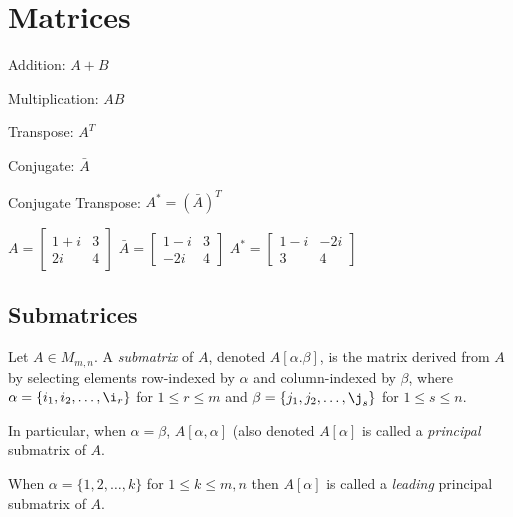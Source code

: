 \documentclass[letterpaper,12pt,fleqn]{article}
\renewcommand{\a}{\alpha}
\renewcommand{\b}{\beta}
\begin{document}
\section*{Matrices}

\begin{definition}[Operations]
  \listbreak
  \begin{description}
  \item Addition: $A+B$
  \item Multiplication: $AB$
  \item Transpose: $A^T$
  \item Conjugate: $\bar{A}$
  \item Conjugate Transpose: $A^*=(\bar{A})^T$
  \end{description}
\end{definition}

\begin{example}
  $A=\begin{bmatrix} 1+i & 3 \\ 2i & 4 \end{bmatrix}$
  \hspace{4ex}
  $\bar{A}=\begin{bmatrix} 1-i & 3 \\ -2i & 4 \end{bmatrix}$
  \hspace{4ex}
  $A^*=\begin{bmatrix} 1-i & -2i \\ 3 & 4 \end{bmatrix}$
\end{example}

\subsection*{Submatrices}

\begin{definition}[Submatrix]
  Let $A\in M_{m,n}$. A \emph{submatrix} of $A$, denoted $A[\a.\b]$, is the
  matrix derived from $A$ by selecting elements row-indexed by $\a$ and
  column-indexed by $\b$, where $\a=\{i_1,i_2,\ldots,\i_r\}$ for
  $1\le r\le m$ and $\b=\{j_1,j_2,\ldots,\j_s\}$ for $1\le s\le n$.

  In particular, when $\a=\b$, $A[\a,\a]$ (also denoted $A[\a]$ is called a
  \emph{principal} submatrix of $A$.

  When $\a=\{1,2,\ldots,k\}$ for $1\le k\le m,n$ then $A[\a]$ is called a
  \emph{leading} principal submatrix of $A$.
\end{definition}
\end{document}
